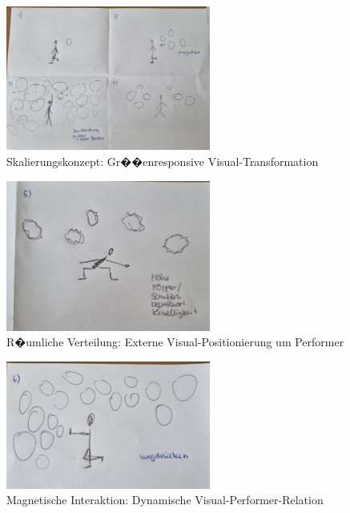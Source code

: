 \begin{figure}[!htbp]
    \centering
    \includegraphics[width=0.6\textwidth,height=0.25\textheight,keepaspectratio]{images/Sprint3_1.jpg}
    \caption{Skalierungskonzept: Gr��enresponsive Visual-Transformation}
    \label{fig:scaling_concept}
\end{figure}

\begin{figure}[!htbp]
    \centering
    \includegraphics[width=0.6\textwidth,height=0.25\textheight,keepaspectratio]{images/Sprint3_2.jpg}
    \caption{R�umliche Verteilung: Externe Visual-Positionierung um Performer}
    \label{fig:external_positioning}
\end{figure}

\begin{figure}[!htbp]
    \centering
    \includegraphics[width=0.6\textwidth,height=0.25\textheight,keepaspectratio]{images/Sprint3_3.jpg}
    \caption{Magnetische Interaktion: Dynamische Visual-Performer-Relation}
    \label{fig:magnetic_interaction}
\end{figure}

